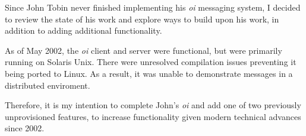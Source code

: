 
Since John Tobin never finished implementing his \emph{oi} messaging
system, I decided to review the state of his work and explore ways to
build upon his work, in addition to adding additional functionality.


As of May 2002, the \emph{oi} client and server were functional, but
were primarily running on Solaris Unix. There were unresolved
compilation issues preventing it being ported to Linux. As a result, it
was unable to demonstrate messages in a distributed enviroment.


Therefore, it is my intention to complete John's \emph{oi} and add one
of two previously unprovisioned features, to increase functionality
given modern technical advances since 2002.
